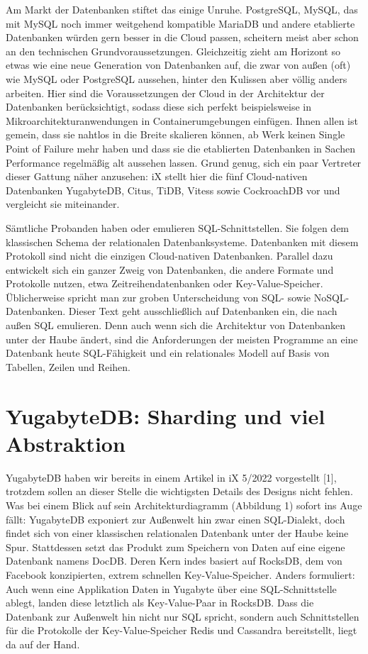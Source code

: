 Am Markt der Datenbanken stiftet das einige Unruhe. PostgreSQL, MySQL, das mit MySQL noch immer weitgehend kompatible MariaDB und andere etablierte Datenbanken würden gern besser in die Cloud passen, scheitern meist aber schon an den technischen Grundvoraussetzungen. Gleichzeitig zieht am Horizont so etwas wie eine neue Generation von Datenbanken auf, die zwar von außen (oft) wie MySQL oder PostgreSQL aussehen, hinter den Kulissen aber völlig anders arbeiten. Hier sind die Voraussetzungen der Cloud in der Architektur der Datenbanken berücksichtigt, sodass diese sich perfekt beispielsweise in Mikroarchitekturanwendungen in Containerumgebungen einfügen. Ihnen allen ist gemein, dass sie nahtlos in die Breite skalieren können, ab Werk keinen Single Point of Failure mehr haben und dass sie die etablierten Datenbanken in Sachen Performance regelmäßig alt aussehen lassen. Grund genug, sich ein paar Vertreter dieser Gattung näher anzusehen: iX stellt hier die fünf Cloud-nativen Datenbanken YugabyteDB, Citus, TiDB, Vitess sowie CockroachDB vor und vergleicht sie miteinander.

Sämtliche Probanden haben oder emulieren SQL-Schnittstellen. Sie folgen dem klassischen Schema der relationalen Datenbanksysteme. Datenbanken mit diesem Protokoll sind nicht die einzigen Cloud-nativen Datenbanken. Parallel dazu entwickelt sich ein ganzer Zweig von Datenbanken, die andere Formate und Protokolle nutzen, etwa Zeitreihendatenbanken oder Key-Value-Speicher. Üblicherweise spricht man zur groben Unterscheidung von SQL- sowie NoSQL-Datenbanken. Dieser Text geht ausschließlich auf Datenbanken ein, die nach außen SQL emulieren. Denn auch wenn sich die Architektur von Datenbanken unter der Haube ändert, sind die Anforderungen der meisten Programme an eine Datenbank heute SQL-Fähigkeit und ein relationales Modell auf Basis von Tabellen, Zeilen und Reihen.

\section{YugabyteDB: Sharding und viel Abstraktion}

YugabyteDB haben wir bereits in einem Artikel in iX 5/2022 vorgestellt [1], trotzdem sollen an dieser Stelle die wichtigsten Details des Designs nicht fehlen. Was bei einem Blick auf sein Architekturdiagramm (Abbildung 1) sofort ins Auge fällt: YugabyteDB exponiert zur Außenwelt hin zwar einen SQL-Dialekt, doch findet sich von einer klassischen relationalen Datenbank unter der Haube keine Spur. Stattdessen setzt das Produkt zum Speichern von Daten auf eine eigene Datenbank namens DocDB. Deren Kern indes basiert auf RocksDB, dem von Facebook konzipierten, extrem schnellen Key-Value-Speicher. Anders formuliert: Auch wenn eine Applikation Daten in Yugabyte über eine SQL-Schnittstelle ablegt, landen diese letztlich als Key-Value-Paar in RocksDB. Dass die Datenbank zur Außenwelt hin nicht nur SQL spricht, sondern auch Schnittstellen für die Protokolle der Key-Value-Speicher Redis und Cassandra bereitstellt, liegt da auf der Hand.


